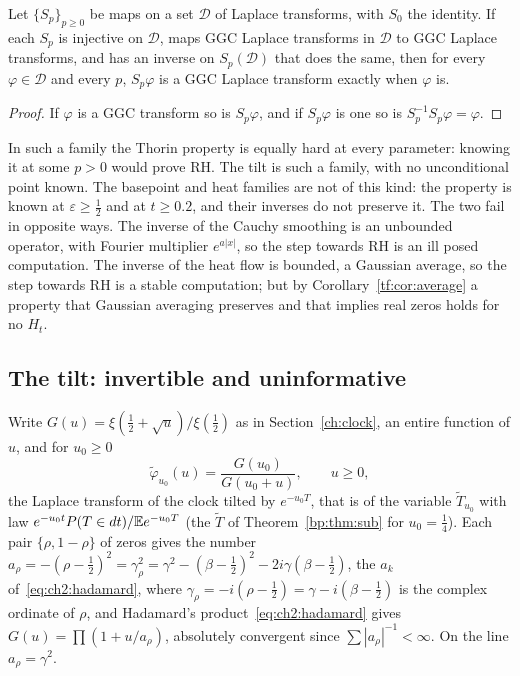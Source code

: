 \begin{proposition}\label{tf:prop:noinfo}
Let $\{S_p\}_{p\ge0}$ be maps on a set $\mathcal D$ of Laplace transforms, with $S_0$ the identity. If each $S_p$ is injective on $\mathcal D$, maps GGC Laplace transforms in $\mathcal D$ to GGC Laplace transforms, and has an inverse on $S_p(\mathcal D)$ that does the same, then for every $\varphi\in\mathcal D$ and every $p$, $S_p\varphi$ is a GGC Laplace transform exactly when $\varphi$ is.
\end{proposition}

\begin{proof}
If $\varphi$ is a GGC transform so is $S_p\varphi$, and if $S_p\varphi$ is one so is $S_p^{-1}S_p\varphi=\varphi$.
\end{proof}

In such a family the Thorin property is equally hard at every parameter: knowing it at some $p>0$ would prove RH. The tilt is such a family, with no unconditional point known. The basepoint and heat families are not of this kind: the property is known at $\varepsilon\ge\tfrac12$ and at $t\ge0.2$, and their inverses do not preserve it. The two fail in opposite ways. The inverse of the Cauchy smoothing is an unbounded operator, with Fourier multiplier $e^{a|x|}$, so the step towards RH is an ill posed computation. The inverse of the heat flow is bounded, a Gaussian average, so the step towards RH is a stable computation; but by Corollary~\ref{tf:cor:average} a property that Gaussian averaging preserves and that implies real zeros holds for no $H_t$.

\subsection{The tilt: invertible and uninformative}\label{tf:sec:tilt}

Write $G(u)=\xi(\tfrac12+\sqrt u)/\xi(\tfrac12)$ as in Section~\ref{ch:clock}, an entire function of $u$, and for $u_0\ge0$
\[
\widetilde\varphi_{u_0}(u)=\frac{G(u_0)}{G(u_0+u)},\qquad u\ge0 ,
\]
the Laplace transform of the clock tilted by $e^{-u_0T}$, that is of the variable $\widetilde T_{u_0}$ with law $e^{-u_0t}P(T\in dt)/\mathbb{E} e^{-u_0T}$ (the $\widetilde T$ of Theorem~\ref{bp:thm:sub} for $u_0=\tfrac14$). Each pair $\{\rho,1-\rho\}$ of zeros gives the number $a_\rho=-(\rho-\tfrac12)^2=\gamma_\rho^2=\gamma^2-(\beta-\tfrac12)^2-2i\gamma(\beta-\tfrac12)$, the $a_k$ of~\eqref{eq:ch2:hadamard}, where $\gamma_\rho=-i(\rho-\tfrac12)=\gamma-i(\beta-\tfrac12)$ is the complex ordinate of $\rho$, and Hadamard's product~\eqref{eq:ch2:hadamard} gives $G(u)=\prod(1+u/a_\rho)$, absolutely convergent since $\sum|a_\rho|^{-1}<\infty$. On the line $a_\rho=\gamma^2$.

